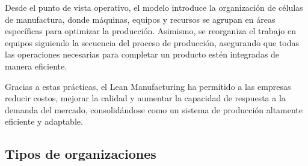\documentclass[a4paper,oneside,11pt]{article}
\begin{document}
Desde el punto de vista operativo, el modelo introduce la organización de células de manufactura, donde máquinas, equipos y recursos se agrupan en áreas específicas para optimizar la producción. Asimismo, se reorganiza el trabajo en equipos siguiendo la secuencia del proceso de producción, asegurando que todas las operaciones necesarias para completar un producto estén integradas de manera eficiente.

Gracias a estas prácticas, el Lean Manufacturing ha permitido a las empresas reducir costos, mejorar la calidad y aumentar la capacidad de respuesta a la demanda del mercado, consolidándose como un sistema de producción altamente eficiente y adaptable.


\subsection{Tipos de organizaciones}
\end{document}
